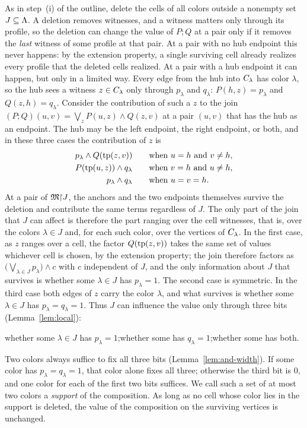 As in step~(i) of the outline, delete the cells of all colors outside a
nonempty set $J\subseteq\Lambda$. A deletion removes witnesses, and a witness
matters only through its profile, so the deletion can change the value of
$P;Q$ at a pair only if it removes the \emph{last} witness of some profile
at that pair. At a pair with no hub endpoint this never happens: by the
extension property, a single surviving cell already realizes every profile
that the deleted cells realized. At a pair with a hub endpoint it can
happen, but only in a limited way. Every edge from the hub into
$C_{\lambda}$ has color $\lambda$, so the hub sees a witness
$z\in C_{\lambda}$ only through $p_\lambda$ and $q_\lambda$:
$P(h,z)=p_\lambda$ and $Q(z,h)=q_\lambda$. Consider the contribution of such
a $z$ to the join $(P;Q)(u,v)=\bigvee_zP(u,z)\land Q(z,v)$ at a pair $(u,v)$
that has the hub as an endpoint. The hub may be the left endpoint, the right
endpoint, or both, and in these three cases the contribution of $z$ is
\[
 \begin{aligned}
  p_\lambda\land Q(\operatorname{tp}(z,v))&\qquad\text{when }u=h\text{ and }v\ne h,\\
  P(\operatorname{tp}(u,z))\land q_\lambda&\qquad\text{when }v=h\text{ and }u\ne h,\\
  p_\lambda\land q_\lambda&\qquad\text{when }u=v=h.
 \end{aligned}
\]
At a pair of $\mathfrak M\mathord{\restriction} J$, the anchors and the two endpoints themselves
survive the deletion and contribute the same terms regardless of $J$. The
only part of the join that $J$ can affect is therefore the part ranging over
the cell witnesses, that is, over the colors $\lambda\in J$ and, for each
such color, over the vertices of $C_{\lambda}$. In the first case, as $z$
ranges over a cell, the factor $Q(\operatorname{tp}(z,v))$ takes the same set of values
whichever cell is chosen, by the extension property; the join therefore
factors as $\bigl(\bigvee_{\lambda\in J}p_\lambda\bigr)\land c$ with $c$
independent of $J$, and the only information about $J$ that survives is
whether some $\lambda\in J$ has $p_\lambda=1$. The second case is symmetric.
In the third case both edges of $z$ carry the color $\lambda$, and what
survives is whether some $\lambda\in J$ has $p_\lambda=q_\lambda=1$. Thus
$J$ can influence the value only through three bits (Lemma~\ref{lem:local}):
\begin{center}
whether some $\lambda\in J$ has $p_\lambda=1$;\quad whether some has
$q_\lambda=1$;\quad whether some has both.
\end{center}
Two colors always suffice to fix all three bits (Lemma~\ref{lem:and-width}).
If some color has $p_\lambda=q_\lambda=1$, that color alone fixes all three;
otherwise the third bit is $0$, and one color for each of the first two bits
suffices. We call such a set of at most two colors a \emph{support} of the
composition. As long as no cell whose color lies in the support is deleted,
the value of the composition on the surviving vertices is unchanged.

